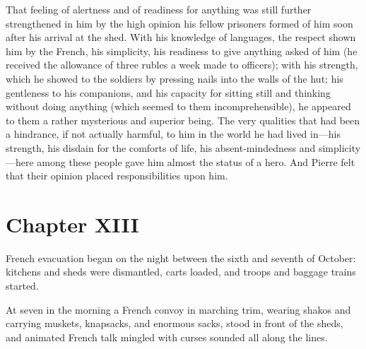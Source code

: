 That feeling of alertness and of readiness for anything was still
further strengthened in him by the high opinion his fellow
prisoners formed of him soon after his arrival at the shed. With
his knowledge of languages, the respect shown him by the French,
his simplicity, his readiness to give anything asked of him (he
received the allowance of three rubles a week made to officers);
with his strength, which he showed to the soldiers by pressing
nails into the walls of the hut; his gentleness to his
companions, and his capacity for sitting still and thinking
without doing anything (which seemed to them incomprehensible),
he appeared to them a rather mysterious and superior being. The
very qualities that had been a hindrance, if not actually
harmful, to him in the world he had lived in---his strength, his
disdain for the comforts of life, his absent-mindedness and
simplicity---here among these people gave him almost the status
of a hero. And Pierre felt that their opinion placed
responsibilities upon him.


\chapter*{Chapter XIII} \ifaudio {}
\fi

 French evacuation began on the night between the sixth and
seventh of October: kitchens and sheds were dismantled, carts
loaded, and troops and baggage trains started.

At seven in the morning a French convoy in marching trim, wearing
shakos and carrying muskets, knapsacks, and enormous sacks, stood
in front of the sheds, and animated French talk mingled with
curses sounded all along the lines.


